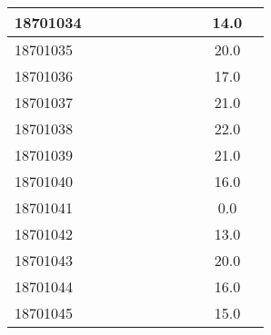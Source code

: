 \documentclass[12pt]{article}
\begin{document}
\begin{center}
\begin{small}
\begin{tabular}{|l|c|c|c|c|c|c|c|c|c|c|}
18701034 &  &  &  &  &  &  &  &  & 14.0\\ \hline 
18701035 &  &  &  &  &  &  &  &  & 20.0\\ \hline 
18701036 &  &  &  &  &  &  &  &  & 17.0\\ \hline 
18701037 &  &  &  &  &  &  &  &  & 21.0\\ \hline 
18701038 &  &  &  &  &  &  &  &  & 22.0\\ \hline 
18701039 &  &  &  &  &  &  &  &  & 21.0\\ \hline 
18701040 &  &  &  &  &  &  &  &  & 16.0\\ \hline 
18701041 &  &  &  &  &  &  &  &  & 0.0\\ \hline 
18701042 &  &  &  &  &  &  &  &  & 13.0\\ \hline 
18701043 &  &  &  &  &  &  &  &  & 20.0\\ \hline 
18701044 &  &  &  &  &  &  &  &  & 16.0\\ \hline 
18701045 &  &  &  &  &  &  &  &  & 15.0\\ \hline 
        \end{tabular}
            \end{small}
            \end{center}
  \centering
            
\end{document}
